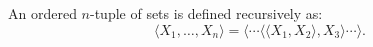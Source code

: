 An ordered $n$-tuple of sets is defined recursively as:
$$\langle X_1, \ldots, X_n \rangle = \langle \cdots \langle \langle X_1, X_2 \rangle, X_3 \rangle \cdots \rangle.$$
